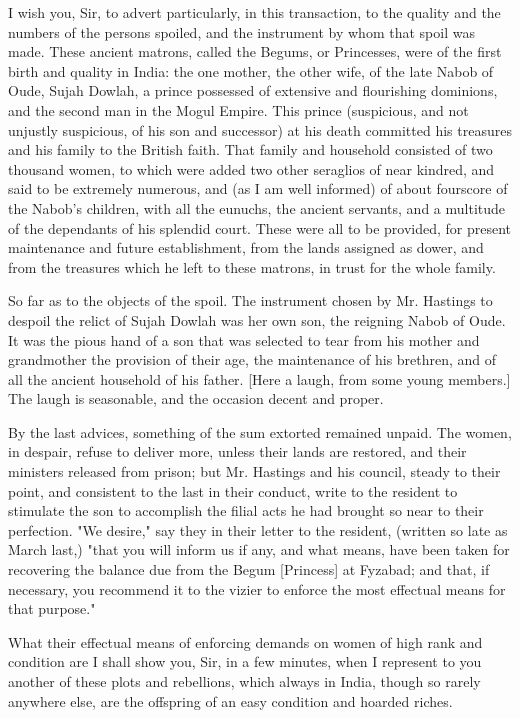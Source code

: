 I wish you, Sir, to advert particularly, in this transaction, to the quality and the numbers of the persons spoiled, and the instrument by whom that spoil was made. These ancient matrons, called the Begums, or Princesses, were of the first birth and quality in India: the one mother, the other wife, of the late Nabob of Oude, Sujah Dowlah, a prince possessed of extensive and flourishing dominions, and the second man in the Mogul Empire. This prince (suspicious, and not unjustly suspicious, of his son and successor) at his death committed his treasures and his family to the British faith. That family and household consisted of two thousand women, to which were added two other seraglios of near kindred, and said to be extremely numerous, and (as I am well informed) of about fourscore of the Nabob's children, with all the eunuchs, the ancient servants, and a multitude of the dependants of his splendid court. These were all to be provided, for present maintenance and future establishment, from the lands assigned as dower, and from the treasures which he left to these matrons, in trust for the whole family.

So far as to the objects of the spoil. The instrument chosen by Mr. Hastings to despoil the relict of Sujah Dowlah was her own son, the reigning Nabob of Oude. It was the pious hand of a son that was selected to tear from his mother and grandmother the provision of their age, the maintenance of his brethren, and of all the ancient household of his father. [Here a laugh, from some young members.] The laugh is seasonable, and the occasion decent and proper.

By the last advices, something of the sum extorted remained unpaid. The women, in despair, refuse to deliver more, unless their lands are restored, and their ministers released from prison; but Mr. Hastings and his council, steady to their point, and consistent to the last in their conduct, write to the resident to stimulate the son to accomplish the filial acts he had brought so near to their perfection. "We desire," say they in their letter to the resident, (written so late as March last,) "that you will inform us if any, and what means, have been taken for recovering the balance due from the Begum [Princess] at Fyzabad; and that, if necessary, you recommend it to the vizier to enforce the most effectual means for that purpose."

What their effectual means of enforcing demands on women of high rank and condition are I shall show you, Sir, in a few minutes, when I represent to you another of these plots and rebellions, which always in India, though so rarely anywhere else, are the offspring of an easy condition and hoarded riches.

